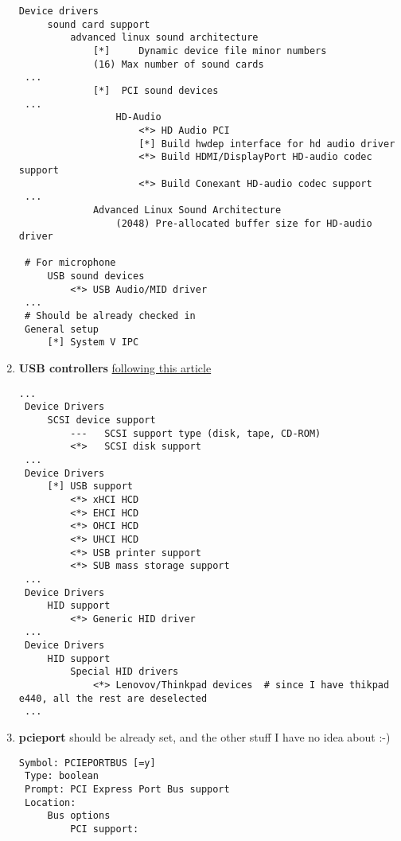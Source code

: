 \documentclass[10pt,a4paper]{article}
\begin{document}
\begin{enumerate}
                   \begin{lstlisting}[style=KernelConfig]
 Device drivers
     sound card support
         advanced linux sound architecture
             [*]     Dynamic device file minor numbers
             (16) Max number of sound cards
 ...
             [*]  PCI sound devices
 ...
                 HD-Audio
                     <*> HD Audio PCI
                     [*] Build hwdep interface for hd audio driver
                     <*> Build HDMI/DisplayPort HD-audio codec support
                     <*> Build Conexant HD-audio codec support
 ...
             Advanced Linux Sound Architecture
                 (2048) Pre-allocated buffer size for HD-audio driver

 # For microphone
     USB sound devices
         <*> USB Audio/MID driver
 ...
 # Should be already checked in
 General setup
     [*] System V IPC
                   \end{lstlisting}

                   \newpage
                   \item \textbf{USB controllers}  \href{https://wiki.gentoo.org/wiki/USB/Guide#Config_options_for_the_kernel}{following this article}

                   \begin{lstlisting}[style=KernelConfig]
 ...
 Device Drivers
     SCSI device support
         ---   SCSI support type (disk, tape, CD-ROM)
         <*>   SCSI disk support
 ...
 Device Drivers
     [*] USB support
         <*> xHCI HCD
         <*> EHCI HCD
         <*> OHCI HCD
         <*> UHCI HCD
         <*> USB printer support
         <*> SUB mass storage support
 ...
 Device Drivers
     HID support
         <*> Generic HID driver
 ...
 Device Drivers
     HID support
         Special HID drivers
             <*> Lenovov/Thinkpad devices  # since I have thikpad e440, all the rest are deselected
 ...
                   \end{lstlisting}

                   \newpage
                   \item \textbf{pcieport} should be already set, and the other stuff I have no idea about :-)

                   \begin{lstlisting}[style=KernelConfig]
 Symbol: PCIEPORTBUS [=y]
 Type: boolean
 Prompt: PCI Express Port Bus support
 Location:
     Bus options
         PCI support:
                   \end{lstlisting}


\end{enumerate}
\end{document}
